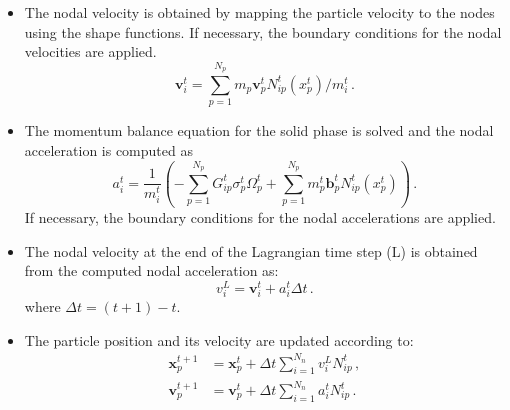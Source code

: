 \begin{itemize}
\item
The nodal velocity is obtained by mapping the particle velocity to the nodes 
using the shape functions. If necessary, the boundary conditions
for the nodal velocities are applied.
%
\begin{equation}
\mathbf{v}_{\mathit{i}}^{\mathit{t}} = 
\sum\limits_{\mathit{p}=1}^{\mathit{N}_{\mathit{p}}} \mathit{m}_{\mathit{p}} 
\mathbf{v}_{\mathit{p}}^{\mathit{t}} 
\mathbf{\mathit{N}}_{\mathit{ip}}^{\mathit{t}} (x^t_p) / 
\mathit{m}_{\mathit{i}}^{\mathit{t}} \,.
\end{equation}

\item
The momentum balance equation for the solid phase is solved and the nodal 
acceleration is computed as
\begin{equation}
\mathbf{\mathit{a}}_i^t = \frac{1}{m_i^t} \left( - \sum\limits_{p = 
1}^{N_p}{G}_{ip}^t \sigma_p^t \Omega_p^t + \sum\limits_{p = 
1}^{N_p}m_p^t \mathbf{b}_p^t N_{ip}^t(x^t_p)  \right) \,.
\end{equation}
If necessary, the boundary conditions for the nodal accelerations are applied.


\item
The nodal velocity at the end of the Lagrangian time step (L) is obtained from 
the computed nodal acceleration as:
\begin{equation}
\mathbf{\mathit{v}}_{\mathit{i}}^{L} = 
\mathit{\mathbf{v}}_{\mathit{i}}^{\mathit{t}} + 
\mathbf{\mathit{a}}_{\mathit{i}}^{\mathit{t}} \Delta \mathit{t} \,.
\end{equation}
where $\Delta t = (t+1) - t$.

\item
The particle position and its velocity are updated according to:
\begin{align}
\nonumber
\mathbf{x}_{\mathit{p}}^{\mathit{t}+1} &  = 
\mathbf{x}_{\mathit{p}}^{\mathit{t}} + 
\Delta \mathit{t} \sum\limits_{\mathit{i}=1}^{\mathit{N}_{n}} 
\mathbf{\mathit{v}}_{\mathit{i}}^{L}\mathit{N}_{\mathit{ip}}^{\mathit{t}} \,, \\
\mathbf{v}_{\mathit{p}}^{\mathit{t}+1} & = \mathbf{v}_{\mathit{p}}^{\mathit{t}} 
+ 
\Delta \mathit{t} \sum\limits_{\mathit{i}=1}^{\mathit{N}_{n}} 
\mathbf{\mathit{a}}_{\mathit{i}}^{t}\mathit{N}_{\mathit{ip}}^{\mathit{t}} \,.
\end{align}



\end{itemize}
